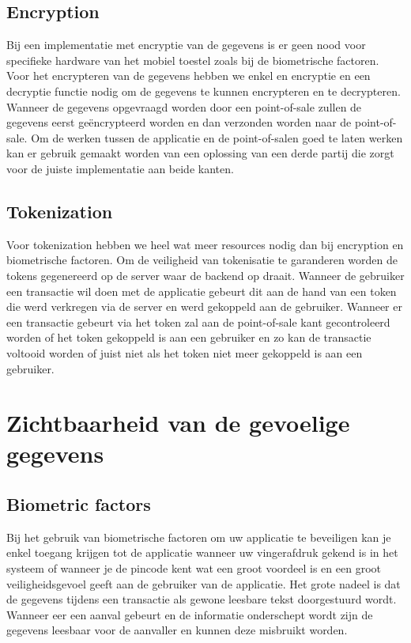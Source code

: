 \subsection{Encryption}
Bij een implementatie met encryptie van de gegevens is er geen nood voor specifieke hardware van het mobiel toestel zoals bij de biometrische factoren. Voor het encrypteren van de gegevens hebben we enkel en encryptie en een decryptie functie nodig om de gegevens te kunnen encrypteren en te decrypteren. Wanneer de gegevens opgevraagd worden door een point-of-sale zullen de gegevens eerst geëncrypteerd worden en dan verzonden worden naar de point-of-sale. Om de werken tussen de applicatie en de point-of-salen goed te laten werken kan er gebruik gemaakt worden van een oplossing van een derde partij die zorgt voor de juiste implementatie aan beide kanten.

\subsection{Tokenization}
Voor tokenization hebben we heel wat meer resources nodig dan bij encryption en biometrische factoren. Om de veiligheid van tokenisatie te garanderen worden de tokens gegenereerd op de server waar de backend op draait. Wanneer de gebruiker een transactie wil doen met de applicatie gebeurt dit aan de hand van een token die werd verkregen via de server en werd gekoppeld aan de gebruiker. Wanneer er een transactie gebeurt via het token zal aan de point-of-sale kant gecontroleerd worden of het token gekoppeld is aan een gebruiker en zo kan de transactie voltooid worden of juist niet als het token niet meer gekoppeld is aan een gebruiker.  

\section{Zichtbaarheid van de gevoelige gegevens}
\label{sec:zichtbaarheid}

\subsection{Biometric factors}
Bij het gebruik van biometrische factoren om uw applicatie te beveiligen kan je enkel toegang krijgen tot de applicatie wanneer uw vingerafdruk gekend is in het systeem of wanneer je de pincode kent wat een groot voordeel is en een groot veiligheidsgevoel geeft aan de gebruiker van de applicatie. Het grote nadeel is dat de gegevens tijdens een transactie als gewone leesbare tekst doorgestuurd wordt. Wanneer eer een aanval gebeurt en de informatie onderschept wordt zijn de gegevens leesbaar voor de aanvaller en kunnen deze misbruikt worden.

